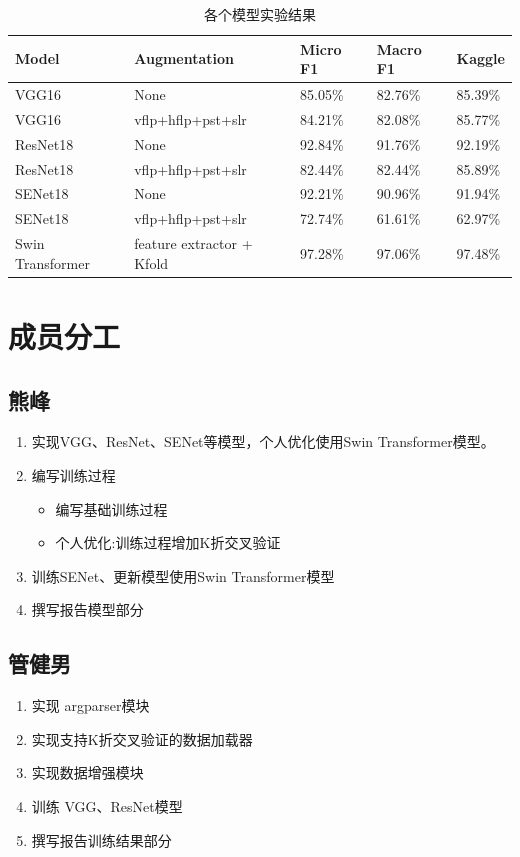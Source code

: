 \documentclass{article}
\begin{document}
\begin{table}[H]
    \centering
    \begin{tabular}{lllll}
        \hline
        \textbf{Model}   & \textbf{Augmentation}     & \textbf{Micro F1} & \textbf{Macro F1} & \textbf{Kaggle} \\
        \hline
        \hline
        VGG16            & None                      & 85.05\%           & 82.76\%           & 85.39\%         \\
        VGG16            & vflp+hflp+pst+slr         & 84.21\%           & 82.08\%           & 85.77\%         \\
        ResNet18         & None                      & 92.84\%           & 91.76\%           & 92.19\%         \\
        ResNet18         & vflp+hflp+pst+slr         & 82.44\%           & 82.44\%           & 85.89\%         \\
        SENet18          & None                      & 92.21\%           & 90.96\%           & 91.94\%         \\
        SENet18          & vflp+hflp+pst+slr         & 72.74\%           & 61.61\%           & 62.97\%         \\
        Swin Transformer & feature extractor + Kfold & 97.28\%           & 97.06\%           & 97.48\%         \\
        \hline
    \end{tabular}
    \label{all_models_cmp}
    \caption{各个模型实验结果}
\end{table}

\section{成员分工}
\subsection{熊峰}
\begin{enumerate} 
    \item 实现VGG、ResNet、SENet等模型，个人优化使用Swin Transformer模型。
    \item 编写训练过程
          \begin{itemize}
              \item 编写基础训练过程
              \item 个人优化:训练过程增加K折交叉验证
          \end{itemize}
    \item 训练SENet、更新模型使用Swin Transformer模型
    \item 撰写报告模型部分
\end{enumerate}
\subsection{管健男}
\begin{enumerate} 
    \item 实现 argparser模块
    \item 实现支持K折交叉验证的数据加载器
    \item 实现数据增强模块
    \item 训练 VGG、ResNet模型
    \item 撰写报告训练结果部分
\end{enumerate}




\end{document}
